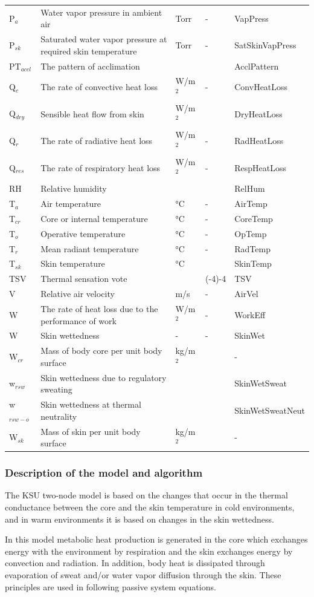 \begin{longtable}[c]{p{1.2in}p{2.0in}p{0.8in}p{0.8in}p{1.2in}}
P\(_{a}\) & Water vapor pressure in ambient air & Torr & - & VapPress \tabularnewline
P\(_{sk}\) & Saturated water vapor pressure at required skin temperature & Torr & - & SatSkinVapPress \tabularnewline
PT\(_{accl}\) & The pattern of acclimation & ~ & ~ & AcclPattern \tabularnewline
Q\(_{c}\) & The rate of convective heat loss & W/m\(^{2}\) & - & ConvHeatLoss \tabularnewline
Q\(_{dry}\) & Sensible heat flow from skin & W/m\(^{2}\) & ~ & DryHeatLoss \tabularnewline
Q\(_{r}\) & The rate of radiative heat loss & W/m\(^{2}\) & - & RadHeatLoss \tabularnewline
Q\(_{res}\) & The rate of respiratory heat loss & W/m\(^{2}\) & - & RespHeatLoss \tabularnewline
RH & Relative humidity & ~ & ~ & RelHum \tabularnewline
T\(_{a}\) & Air temperature & °C & - & AirTemp \tabularnewline
T\(_{cr}\) & Core or internal temperature & °C & - & CoreTemp \tabularnewline
T\(_{o}\) & Operative temperature & °C & - & OpTemp \tabularnewline
T\(_{r}\) & Mean radiant temperature & °C & - & RadTemp \tabularnewline
T\(_{sk}\) & Skin temperature & °C & ~ & SkinTemp \tabularnewline
TSV & Thermal sensation vote & ~ & (-4)-4 & TSV \tabularnewline
V & Relative air velocity & m/s & - & AirVel \tabularnewline
W & The rate of heat loss due to the performance of work & W/m\(^{2}\) & - & WorkEff \tabularnewline
W & Skin wettedness & - & - & SkinWet \tabularnewline
W\(_{cr}\) & Mass of body core per unit body surface & kg/m\(^{2}\) & ~ & - \tabularnewline
w\(_{rsw}\) & Skin wettedness due to regulatory sweating & ~ & ~ & SkinWetSweat \tabularnewline
w\(_{rsw-o}\) & Skin wettedness at thermal neutrality & ~ & ~ & SkinWetSweatNeut \tabularnewline
W\(_{sk}\) & Mass of skin per unit body surface & kg/m\(^{2}\) & ~ & - \tabularnewline
\bottomrule
\end{longtable}

\subsubsection{Description of the model and algorithm}\label{description-of-the-model-and-algorithm-2}

The KSU two-node model is based on the changes that occur in the thermal conductance between the core and the skin temperature in cold environments, and in warm environments it is based on changes in the skin wettedness.

In this model metabolic heat production is generated in the core which exchanges energy with the environment by respiration and the skin exchanges energy by convection and radiation. In addition, body heat is dissipated through evaporation of sweat and/or water vapor diffusion through the skin. These principles are used in following passive system equations.

